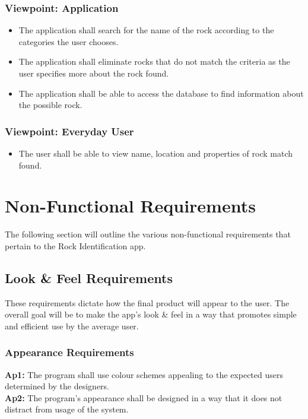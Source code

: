 \documentclass[titlepage]{article}
\begin{document}
\subsubsection{Viewpoint: Application}
\begin{itemize}

  \item The application shall search for the name of the rock according to the categories the user chooses.
  \item The application shall eliminate rocks that do not match the criteria as the user specifies more about the rock found. 
  \item The application shall be able to access the database to find information about the possible rock. 
  \end{itemize}
    \subsubsection{Viewpoint: Everyday User}
  \begin{itemize}
  \item The user shall be able to view name, location and properties of rock match found. 
\end{itemize}


\section{Non-Functional Requirements}

The following section will outline the various non-functional requirements that pertain to the Rock Identification app.

\subsection{Look \& Feel Requirements}
These requirements dictate how the final product will appear to the user. The overall goal will be to make the app's look \& feel in a way that promotes simple and efficient use by the average user.
\subsubsection{Appearance Requirements}
\textbf{Ap1:} The program shall use colour schemes appealing to the expected users determined by the designers.\\

\noindent\textbf{Ap2:} The program's appearance shall be designed in a way that it does not distract from usage of the system.\\
\end{document}
